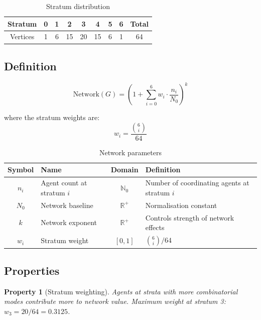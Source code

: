 \documentclass[11pt,a4paper]{article}
\newtheorem{property}{Property}[section]
\begin{document}
\begin{table}[h]
\centering
\caption{Stratum distribution}
\begin{tabular}{@{}ccccccccc@{}}
\toprule
Stratum & 0 & 1 & 2 & 3 & 4 & 5 & 6 & Total \\
\midrule
Vertices & 1 & 6 & 15 & 20 & 15 & 6 & 1 & 64 \\
\bottomrule
\end{tabular}
\end{table}

\subsection{Definition}

\begin{equation}\label{eq:network}
\mathrm{Network}(G) = \left(1 + \sum_{i=0}^{6} w_i \cdot \frac{n_i}{N_0}\right)^{\!k}
\end{equation}

\noindent where the stratum weights are:
\begin{equation}
w_i = \frac{\binom{6}{i}}{64}
\end{equation}

\begin{table}[h]
\centering
\caption{Network parameters}
\begin{tabular}{@{}clcL{6.5cm}@{}}
\toprule
\textbf{Symbol} & \textbf{Name} & \textbf{Domain} & \textbf{Definition} \\
\midrule
$n_i$ & Agent count at stratum $i$ & $\mathbb{N}_0$ & Number of coordinating agents at stratum $i$ \\
$N_0$ & Network baseline & $\mathbb{R}^+$ & Normalisation constant \\
$k$ & Network exponent & $\mathbb{R}^+$ & Controls strength of network effects \\
$w_i$ & Stratum weight & $[0,1]$ & $\binom{6}{i}/64$ \\
\bottomrule
\end{tabular}
\end{table}

\subsection{Properties}

\begin{property}[Stratum weighting]
Agents at strata with more combinatorial modes contribute more to network value. Maximum weight at stratum 3: $w_3 = 20/64 = 0.3125$.
\end{property}
\end{document}
